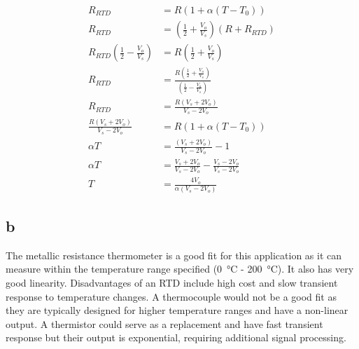 \documentclass[11pt]{article}
\numberwithin{equation}{section}
\begin{document}
\begin{align}
    R_{RTD} &= R \left(1+\alpha\left(T - T_0\right)\right) \label{eq:q4a3}\\
    R_{RTD} &= \left(\frac{1}{2} + \frac{V_o}{V_s}\right)\left(R + R_{RTD}\right)\\
    R_{RTD}\left(\frac{1}{2}-\frac{V_o}{V_s}\right) &= R\left(\frac{1}{2}+\frac{V_o}{V_s}\right)\\
    R_{RTD} &= \frac{R\left(\frac{1}{2} + \frac{V_o}{V_s}\right)}{\left(\frac{1}{2}-\frac{V_o}{V_s}\right)}\\
    R_{RTD} &= \frac{R\left(V_s + 2V_o\right)}{V_s - 2V_o}\\
    \frac{R\left(V_s + 2V_o\right)}{V_s - 2V_o} &= R \left(1+\alpha\left(T - T_0\right)\right)\\
    \alpha T &= \frac{\left(V_s + 2V_o\right)}{V_s - 2V_o}-1 \\
    \alpha T &= \frac{V_s + 2V_o}{V_s - 2V_o} - \frac{V_s - 2V_o}{V_s - 2V_o} \\
    T &= \frac{4V_o}{\alpha\left(V_s - 2V_o\right)} \label{eq:q4a4}
\end{align}
\subsection{b}
The metallic resistance thermometer is a good fit for this application as it can measure within the temperature range specified (\SI{0}{\celsius} - \SI{200}{\celsius}). It also has very good linearity. Disadvantages of an RTD include high cost and slow transient response to temperature changes. A thermocouple would not be a good fit as they are typically designed for higher temperature ranges and have a non-linear output. A thermistor could serve as a replacement and have fast transient response but their output is exponential, requiring additional signal processing. 
\end{document}

